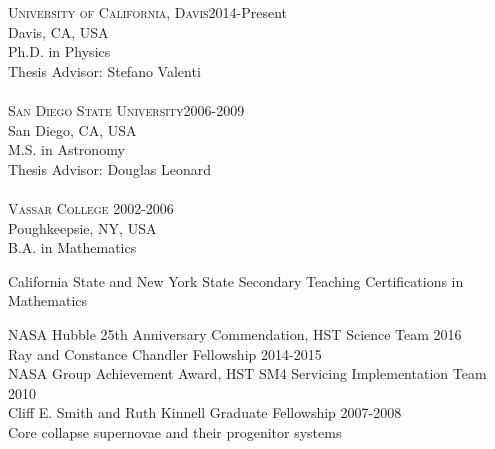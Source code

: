 \documentclass[10pt]{cv}
\begin{document}
\begin{llist}
\vspace{-0.1in}   
\textsc{University of California, Davis}\hfill 2014-Present\\
Davis, CA, USA \\
Ph.D. in Physics \\
Thesis Advisor: Stefano Valenti \\
\\
\textsc{San Diego State University}\hfill 2006-2009\\
San Diego, CA, USA \\
M.S. in Astronomy \\
Thesis Advisor: Douglas Leonard \\
\\
\textsc{Vassar College} \hfill 2002-2006 \\
Poughkeepsie, NY, USA \\
B.A. in Mathematics \\
\begin{minipage}[l]{0.7\textwidth}\vspace{0.15cm}
California State and New York State Secondary Teaching Certifications in Mathematics \\
\end{minipage}
\vspace{-0.1in}   
NASA Hubble 25th Anniversary Commendation, HST Science Team \hfill 2016 \\ %
Ray and Constance Chandler Fellowship \hfill 2014-2015 \\ %
NASA Group Achievement Award, HST SM4 Servicing Implementation Team \hfill2010 \\
Cliff E. Smith and Ruth Kinnell Graduate Fellowship \hfill 2007-2008\\ %
\vspace{-0.1in}   
Core collapse supernovae and their progenitor systems\\

\end{llist}
\end{document}
